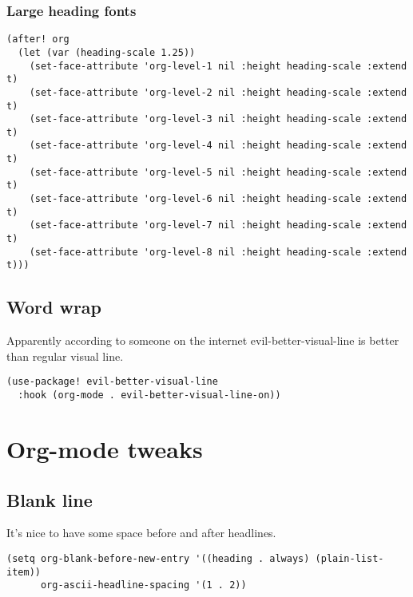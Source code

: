 \documentclass[11pt]{article}
\begin{document}
\subsubsection{Large heading fonts}
\label{sec:org5a7b629}
\begin{verbatim}
(after! org
  (let (var (heading-scale 1.25))
    (set-face-attribute 'org-level-1 nil :height heading-scale :extend t)
    (set-face-attribute 'org-level-2 nil :height heading-scale :extend t)
    (set-face-attribute 'org-level-3 nil :height heading-scale :extend t)
    (set-face-attribute 'org-level-4 nil :height heading-scale :extend t)
    (set-face-attribute 'org-level-5 nil :height heading-scale :extend t)
    (set-face-attribute 'org-level-6 nil :height heading-scale :extend t)
    (set-face-attribute 'org-level-7 nil :height heading-scale :extend t)
    (set-face-attribute 'org-level-8 nil :height heading-scale :extend t)))
\end{verbatim}

\subsection{Word wrap}
\label{sec:orgee03dc7}
Apparently according to someone on the internet evil-better-visual-line is better than regular visual line.
\begin{verbatim}
(use-package! evil-better-visual-line
  :hook (org-mode . evil-better-visual-line-on))
\end{verbatim}

\section{Org-mode tweaks}
\label{sec:org5af30b0}

\subsection{Blank line}
\label{sec:org6e38c83}
It's nice to have some space before and after headlines.
\begin{verbatim}
(setq org-blank-before-new-entry '((heading . always) (plain-list-item))
      org-ascii-headline-spacing '(1 . 2))
\end{verbatim}
\end{document}
